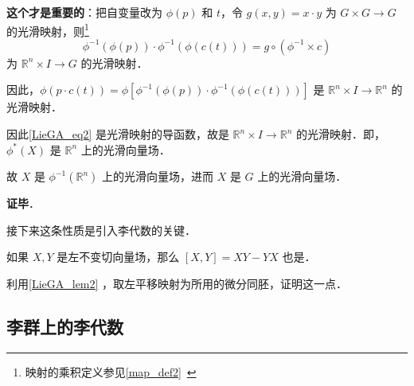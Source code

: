 \textbf{这个才是重要的}：把自变量改为 $\phi(p)$ 和 $t$，令 $g(x, y)=x\cdot y$ 为 $G\times G\to G$ 的光滑映射，则\footnote{映射的乘积定义参见\autoref{map_def2}~}
\begin{equation}
\phi^{-1}(\phi(p))\cdot \phi^{-1}(\phi(c(t)))=g\circ(\phi^{-1}\times c)
\end{equation}
为 $\mathbb{R}^n\times I\to G$ 的光滑映射．

因此，$\phi(p\cdot c(t))=\phi[\phi^{-1}(\phi(p))\cdot \phi^{-1}(\phi(c(t)))]$ 是 $\mathbb{R}^n\times I\to \mathbb{R}^n$ 的光滑映射．

因此\autoref{LieGA_eq2} 是光滑映射的导函数，故是 $\mathbb{R}^n\times I\to \mathbb{R}^n$ 的光滑映射．即，$\phi^*(X)$ 是 $\mathbb{R}^n$ 上的光滑向量场．

故 $X$ 是 $\phi^{-1}(\mathbb{R}^n)$ 上的光滑向量场，进而 $X$ 是 $G$ 上的光滑向量场．









\textbf{证毕}．

接下来这条性质是引入李代数的关键．

\begin{exercise}{}
如果 $X, Y$ 是左不变切向量场，那么 $[X, Y]=XY-YX$ 也是．

利用\autoref{LieGA_lem2} ，取左平移映射为所用的微分同胚，证明这一点．
\end{exercise}


\subsection{李群上的李代数}

